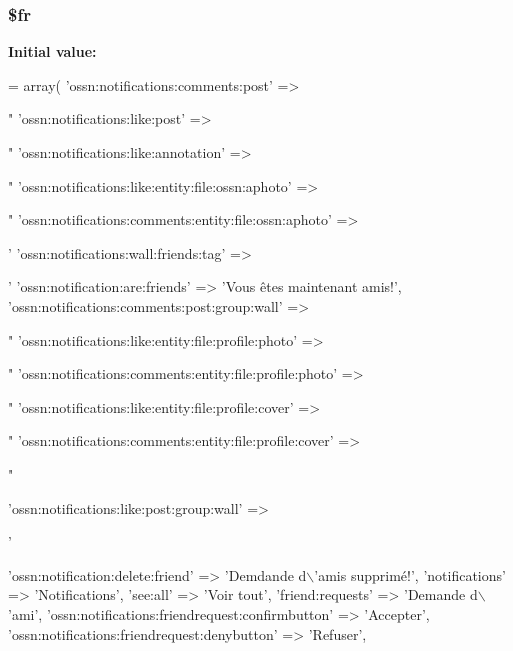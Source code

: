 \subsubsection[{\texorpdfstring{\$fr}{$fr}}]{\setlength{\rightskip}{0pt plus 5cm}\$fr}\hypertarget{components_2_ossn_notifications_2locale_2ossn_8fr_8php_ad5107c697816e7b7f89ad1b3e94e3e0e}{}\label{components_2_ossn_notifications_2locale_2ossn_8fr_8php_ad5107c697816e7b7f89ad1b3e94e3e0e}
{\bfseries Initial value\+:}
\begin{DoxyCode}
= array(
    \textcolor{stringliteral}{'ossn:notifications:comments:post'} => \textcolor{stringliteral}{"%
    \textcolor{stringliteral}{'ossn:notifications:like:post'} => \textcolor{stringliteral}{"%
    \textcolor{stringliteral}{'ossn:notifications:like:annotation'} => \textcolor{stringliteral}{"%
    \textcolor{stringliteral}{'ossn:notifications:like:entity:file:ossn:aphoto'} => \textcolor{stringliteral}{"%
    \textcolor{stringliteral}{'ossn:notifications:comments:entity:file:ossn:aphoto'} => \textcolor{stringliteral}{'%
    \textcolor{stringliteral}{'ossn:notifications:wall:friends:tag'} => \textcolor{stringliteral}{'%
    \textcolor{stringliteral}{'ossn:notification:are:friends'} => \textcolor{stringliteral}{'Vous êtes maintenant amis!'},
    \textcolor{stringliteral}{'ossn:notifications:comments:post:group:wall'} => \textcolor{stringliteral}{"%
    \textcolor{stringliteral}{'ossn:notifications:like:entity:file:profile:photo'} => \textcolor{stringliteral}{"%
    \textcolor{stringliteral}{'ossn:notifications:comments:entity:file:profile:photo'} => \textcolor{stringliteral}{"%
    \textcolor{stringliteral}{'ossn:notifications:like:entity:file:profile:cover'} => \textcolor{stringliteral}{"%
    \textcolor{stringliteral}{'ossn:notifications:comments:entity:file:profile:cover'} => \textcolor{stringliteral}{"%

    \textcolor{stringliteral}{'ossn:notifications:like:post:group:wall'} => \textcolor{stringliteral}{'%
    
    \textcolor{stringliteral}{'ossn:notification:delete:friend'} => \textcolor{stringliteral}{'Demdande d\(\backslash\)'amis supprimé!'},
    \textcolor{stringliteral}{'notifications'} => \textcolor{stringliteral}{'Notifications'},
    \textcolor{stringliteral}{'see:all'} => \textcolor{stringliteral}{'Voir tout'},
    \textcolor{stringliteral}{'friend:requests'} => \textcolor{stringliteral}{'Demande d\(\backslash\)'ami'},
    \textcolor{stringliteral}{'ossn:notifications:friendrequest:confirmbutton'} => \textcolor{stringliteral}{'Accepter'},
    \textcolor{stringliteral}{'ossn:notifications:friendrequest:denybutton'} => \textcolor{stringliteral}{'Refuser'},
    
}}}}}}}}}}}}
\end{DoxyCode}
